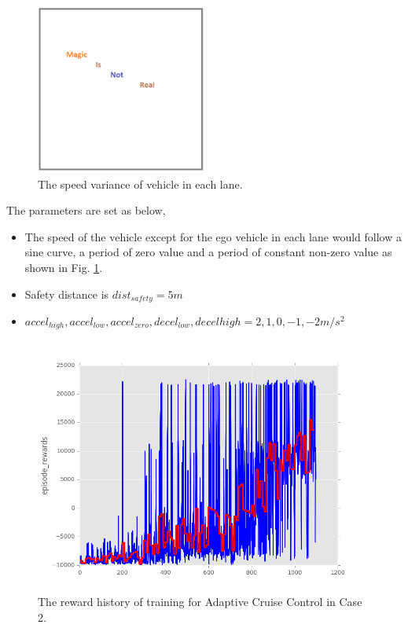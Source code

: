 \begin{figure}[h]
\centering
\includegraphics[width=0.5\textwidth]{figs/magic}
\caption{The speed variance of vehicle in each lane.}
\label{fig:erratic-curve}
\end{figure}

The parameters are set as below,

\begin{itemize}
\item The speed of the vehicle except for the ego vehicle in each lane would follow a sine curve, a period of zero value and a period of constant non-zero value as shown in Fig. \ref{fig:erratic-curve}.
\item Safety distance is  $dist_{safety} = 5 m$
\item $accel_{high}, accel_{low}, accel_{zero}, decel_{low}, decel{high} = {2, 1, 0, -1, -2} m/s^2$
\end{itemize}

\begin{figure}[h]
\centering
\includegraphics[width=1.0\textwidth]{figs/ch5/agent1-reward-history-epoch-1000-b}
\caption{The reward history of training for Adaptive Cruise Control in Case 2.}
\label{fig:res-1-b}
\end{figure}

